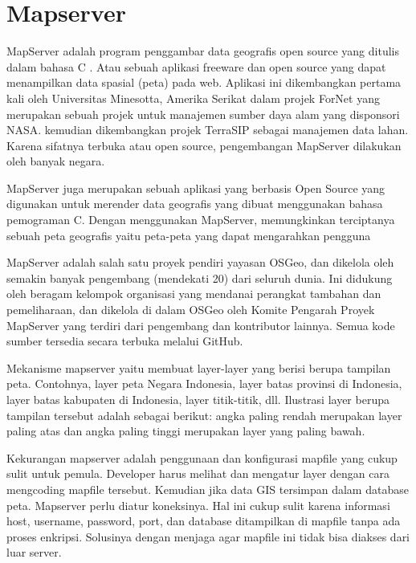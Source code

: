 \section{Mapserver}
MapServer adalah program penggambar data geografis open source yang ditulis
dalam bahasa C \cite{akbar2011peningkatan}. Atau sebuah aplikasi freeware dan open source yang dapat menampilkan data spasial (peta) pada web. Aplikasi ini dikembangkan pertama kali oleh Universitas Minesotta, Amerika Serikat dalam projek ForNet yang merupakan sebuah projek untuk manajemen sumber daya alam yang disponsori NASA. kemudian dikembangkan projek TerraSIP sebagai manajemen data lahan. Karena sifatnya terbuka atau open source, pengembangan MapServer dilakukan oleh banyak negara.

 MapServer juga merupakan sebuah aplikasi yang berbasis Open Source yang digunakan untuk merender data geografis yang dibuat menggunakan bahasa pemograman C. Dengan menggunakan MapServer, memungkinkan terciptanya sebuah peta geografis yaitu peta-peta yang dapat mengarahkan pengguna

MapServer adalah salah satu proyek pendiri yayasan OSGeo, dan dikelola oleh semakin banyak pengembang (mendekati 20) dari seluruh dunia. Ini didukung oleh beragam kelompok organisasi yang mendanai perangkat tambahan dan pemeliharaan, dan dikelola di dalam OSGeo oleh Komite Pengarah Proyek MapServer yang terdiri dari pengembang dan kontributor lainnya. Semua kode sumber tersedia secara terbuka melalui GitHub.

Mekanisme mapserver yaitu membuat layer-layer yang berisi berupa tampilan peta. Contohnya, layer peta Negara Indonesia, layer batas provinsi di Indonesia, layer batas kabupaten di Indonesia, layer titik-titik, dll. Ilustrasi layer berupa tampilan tersebut adalah sebagai berikut: angka paling rendah merupakan layer paling atas dan angka paling tinggi merupakan layer yang paling bawah.

Kekurangan mapserver adalah penggunaan dan konfigurasi mapfile yang cukup sulit untuk pemula. Developer harus melihat dan mengatur layer dengan cara mengcoding mapfile tersebut. Kemudian jika data GIS tersimpan dalam database peta. Mapserver perlu diatur koneksinya. Hal ini cukup sulit karena informasi host, username, password, port, dan database ditampilkan di mapfile tanpa ada proses enkripsi. Solusinya dengan menjaga agar mapfile ini tidak bisa diakses dari luar server.

